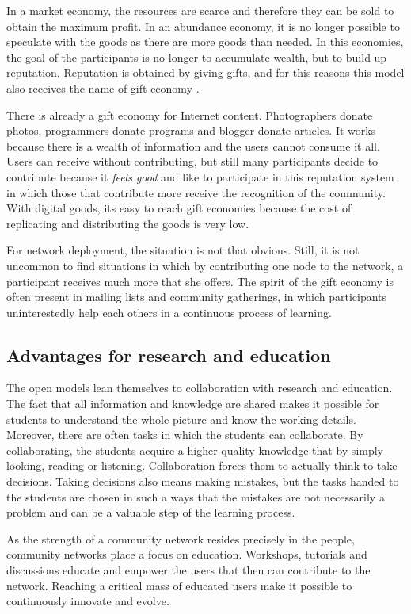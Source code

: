 \documentclass[journal]{IEEEtran}
\begin{document}
In a market economy, the resources are scarce and therefore they can be sold to obtain the maximum profit.
In an abundance economy, it is no longer possible to speculate with the goods as there are more goods than needed.
In this economies, the goal of the participants is no longer to accumulate wealth, but to build up reputation.
Reputation is obtained by giving gifts, and for this reasons this model also receives the name of gift-economy \cite{barbrook1998htg}.

There is already a gift economy for Internet content.
Photographers donate photos, programmers donate programs and blogger donate articles.
It works because there is a wealth of information and the users cannot consume it all.
Users can receive without contributing, but still many participants decide to contribute because it \emph{feels good} and like to participate in this reputation system in which those that contribute more receive the recognition of the community.
With digital goods, its easy to reach gift economies because the cost of replicating and distributing the goods is very low.

For network deployment, the situation is not that obvious.
Still, it is not uncommon to find situations in which by contributing one node to the network, a participant receives much more that she offers.
The spirit of the gift economy is often present in mailing lists and community gatherings, in which participants uninterestedly help each others in a continuous process of learning.

\subsection{Advantages for research and education}

The open models lean themselves to collaboration with research and education.
The fact that all information and knowledge are shared makes it possible for students to understand the whole picture and know the working details.
Moreover, there are often tasks in which the students can collaborate.
By collaborating, the students acquire a higher quality knowledge that by simply looking, reading or listening.
Collaboration forces them to actually think to take decisions.
Taking decisions also means making mistakes, but the tasks handed to the students are chosen in such a ways that the mistakes are not necessarily a problem and can be a valuable step of the learning process.

As the strength of a community network resides precisely in the people, community networks place a focus on education.
Workshops, tutorials and discussions educate and empower the users that then can contribute to the network.
Reaching a critical mass of educated users make it possible to continuously innovate and evolve.
\end{document}
